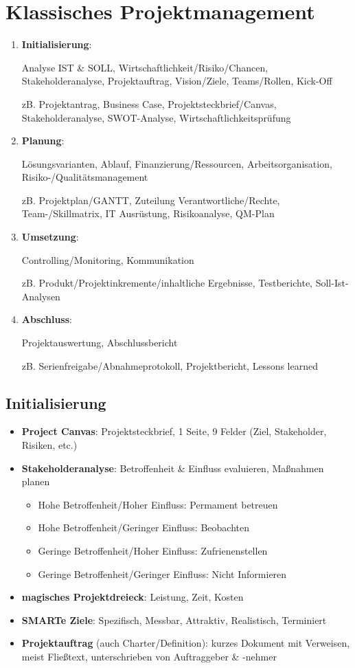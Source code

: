 \documentclass{article}
\begin{document}
\section{Klassisches Projektmanagement}
\begin{enumerate}
  \item \textbf{Initialisierung}:
        \par Analyse IST \& SOLL, Wirtschaftlichkeit/Risiko/Chancen, Stakeholderanalyse, Projektauftrag, Vision/Ziele, Teams/Rollen, Kick-Off
        \par zB. Projektantrag, Business Case, Projektsteckbrief/Canvas, Stakeholderanalyse, SWOT-Analyse, Wirtschaftlichkeitsprüfung
  \item \textbf{Planung}:
        \par Lösungsvarianten, Ablauf, Finanzierung/Ressourcen, Arbeitsorganisation, Risiko-/Qualitätsmanagement
        \par zB. Projektplan/GANTT, Zuteilung Verantwortliche/Rechte, Team-/Skillmatrix, IT Ausrüstung, Risikoanalyse, QM-Plan
  \item \textbf{Umsetzung}:
        \par Controlling/Monitoring, Kommunikation
        \par zB. Produkt/Projektinkremente/inhaltliche Ergebnisse, Testberichte, Soll-Ist-Analysen
  \item \textbf{Abschluss}:
        \par Projektauswertung, Abschlussbericht
        \par zB. Serienfreigabe/Abnahmeprotokoll, Projektbericht, Lessons learned
\end{enumerate}

\subsection{Initialisierung}
\begin{itemize}
  \item \textbf{Project Canvas}: Projektsteckbrief, 1 Seite, 9 Felder (Ziel, Stakeholder, Risiken, etc.)
  \item \textbf{Stakeholderanalyse}: Betroffenheit \& Einfluss evaluieren, Maßnahmen planen
        \begin{itemize}
          \item Hohe Betroffenheit/Hoher Einfluss: Permament betreuen
          \item Hohe Betroffenheit/Geringer Einfluss: Beobachten
          \item Geringe Betroffenheit/Hoher Einfluss: Zufrienenstellen
          \item Geringe Betroffenheit/Geringer Einfluss: Nicht Informieren
        \end{itemize}
  \item \textbf{magisches Projektdreieck}: Leistung, Zeit, Kosten
  \item \textbf{SMARTe Ziele}: Spezifisch, Messbar, Attraktiv, Realistisch, Terminiert
  \item \textbf{Projektauftrag} (auch Charter/Definition): kurzes Dokument mit Verweisen, meist Fließtext, unterschrieben von Auftraggeber \& -nehmer
\end{itemize}
\end{document}
